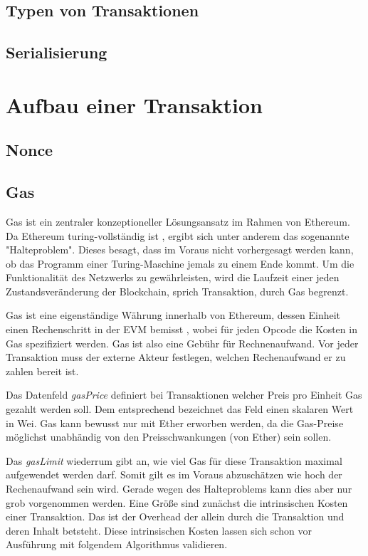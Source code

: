 \documentclass[runningheads]{llncs}
\begin{document}
\subsection{Typen von Transaktionen}
\subsection{Serialisierung}

\section{Aufbau einer Transaktion}

\subsection{Nonce}
\label{nonce}
\subsection{Gas}
\label{gas}
Gas ist ein zentraler konzeptioneller Lösungsansatz im Rahmen von Ethereum. Da Ethereum turing-vollständig ist \cite[S. 1]{wood_ethereum/yellowpaper_2019}, ergibt sich unter anderem das sogenannte "Halteproblem". Dieses besagt, dass im Voraus nicht vorhergesagt werden kann, ob das Programm einer Turing-Maschine jemals zu einem Ende kommt. \cite[S.70]{davis_computability_2013} Um die Funktionalität des Netzwerks zu gewährleisten, wird die Laufzeit einer jeden Zustandsveränderung der Blockchain, sprich Transaktion, durch Gas begrenzt.

Gas ist eine eigenständige Währung innerhalb von Ethereum, dessen Einheit einen Rechenschritt in der EVM bemisst \cite[S. 9:3]{m.spain_oasics-tokeneconomics_2019}, wobei für jeden Opcode die Kosten in Gas spezifiziert werden. \cite[S. 25 ff.]{wood_ethereum/yellowpaper_2019} Gas ist also eine Gebühr für Rechnenaufwand. Vor jeder Transaktion muss der externe Akteur festlegen, welchen Rechenaufwand er zu zahlen bereit ist.

Das Datenfeld \textit{gasPrice} definiert bei Transaktionen welcher Preis pro Einheit Gas gezahlt werden soll. Dem entsprechend bezeichnet das Feld einen skalaren Wert in Wei. Gas kann bewusst nur mit Ether erworben werden, da die Gas-Preise möglichst unabhändig von den Preisschwankungen (von Ether) sein sollen. \cite[S. 7]{wood_ethereum/yellowpaper_2019}

Das \textit{gasLimit} wiederrum gibt an, wie viel Gas für diese Transaktion maximal aufgewendet werden darf. Somit gilt es im Voraus abzuschätzen wie hoch der Rechenaufwand sein wird. Gerade wegen des Halteproblems kann dies aber nur grob vorgenommen werden. Eine Größe sind zunächst die intrinsischen Kosten einer Transaktion. Das ist der Overhead der allein durch die Transaktion und deren Inhalt betsteht. Diese intrinsischen Kosten lassen sich schon vor Ausführung mit folgendem Algorithmus validieren. 
\end{document}
